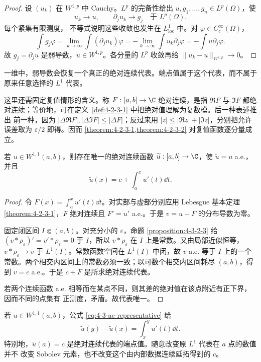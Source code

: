 \begin{proof}
设 $(u_k)$ 在 $W^{1,p}$ 中 Cauchy。$L^p$ 的完备性给出
$u,g_1,\ldots,g_n\in L^p(\Omega)$，使
\[
 u_k\to u,\qquad \partial_ju_k\to g_j
 \quad\text{于 }L^p(\Omega).
\]
每个紧集有限测度，\Holder{} 不等式说明这些收敛也发生在 $L^1_{\mathrm{loc}}$ 中。对
$\varphi\in C_c^\infty(\Omega)$，
\[
 \int g_j\varphi
 =\lim_{k\to\infty}\int(\partial_ju_k)\varphi
 =-\lim_{k\to\infty}\int u_k\partial_j\varphi
 =-\int u\partial_j\varphi.
\]
故 $g_j=\partial_ju$ 是弱导数，$u\in W^{1,p}$。各分量的 $L^p$ 收敛再给
$\|u_k-u\|_{W^{1,p}}\to0$。
\end{proof}

一维中，弱导数会恢复一个真正的绝对连续代表。端点值属于这个代表，而不属于原来任意选择的
$L^1$ 代表。

这里还需固定复值情形的含义。称 $F:[a,b]\to\C$ 绝对连续，是指 $\Re F$ 与 $\Im F$
都绝对连续；等价地，可在定义~\ref{def:4-2-3-1} 中把绝对值理解为复数模。后一种表述推出
前一种，因为 $|\Delta\Re F|,|\Delta\Im F|\le|\Delta F|$；反过来用
$|z|\le|\Re z|+|\Im z|$，分别把允许误差取为 $\varepsilon/2$ 即得。因而
\cref{theorem:4-2-3-1,theorem:4-2-3-2} 对复值函数逐分量成立。

\begin{proposition}\label{proposition:4-3-3-ac-representative}
若 $u\in W^{1,1}(a,b)$，则存在唯一的绝对连续函数 $\widetilde u:[a,b]\to\C$，使
$\widetilde u=u$ a.e.，并且
\[
 \widetilde u(x)=c+\int_a^xu'(t)\dd t.
 \tag{4.3.9}\label{eq:4-3-ac-representative}
\]
\end{proposition}

\begin{proof}
令 $F(x)=\int_a^xu'(t)\dd t$。对实部与虚部分别应用 Lebesgue 基本定理
\ref{theorem:4-2-3-1}，$F$ 绝对连续且 $F'=u'$ a.e.。于是
$v=u-F$ 的分布导数为零。

固定闭区间 $I\Subset(a,b)$。对充分小的 $\varepsilon$，命题
\ref{proposition:4-3-2-3} 给
$(v*\rho_\varepsilon)'=v'*\rho_\varepsilon=0$ 于 $I$，所以
$v*\rho_\varepsilon$ 在 $I$ 上是常数。又由局部近似恒等，
$v*\rho_\varepsilon\to v$ 于 $L^1(I)$。常数函数空间在 $L^1(I)$ 中闭，故 $v$ a.e. 等于
$I$ 上的一个常数。两个相交内区间上的常数必须一致；以可数个相交内区间耗尽 $(a,b)$，得到
$v=c$ a.e.。于是 $c+F$ 是所求绝对连续代表。

若两个连续函数 a.e. 相等而在某点不同，则其差的绝对值在该点附近有正下界，因而不同的点集有
正测度，矛盾。故代表唯一。
\end{proof}

\begin{example}[一维代表]\label{ex:4-3-3-3}
若 $u\in W^{1,1}(a,b)$，公式 \eqref{eq:4-3-ac-representative} 给
\[
 \widetilde u(y)-\widetilde u(x)=\int_x^yu'(t)\dd t.
\]
特别地，$\widetilde u(a)=c$ 是绝对连续代表的端点值。随意改变原 $L^1$ 代表在 $a$ 点的数值并不
改变 Sobolev 元素，也不改变这个由内部数据连续延拓得到的 $c$。
\end{example}

